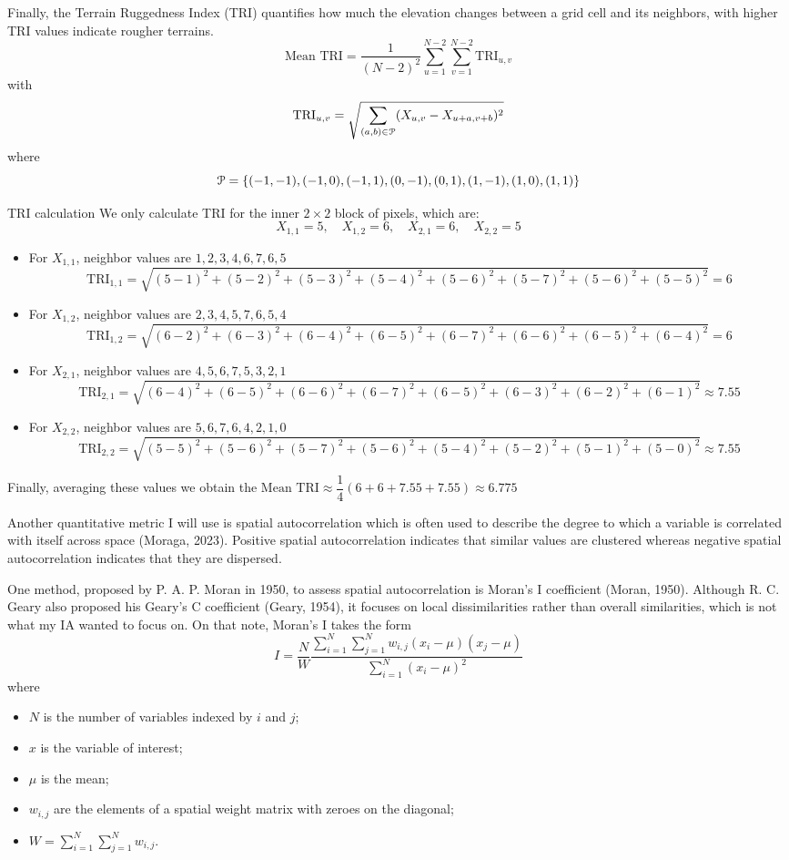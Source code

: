 Finally, the Terrain Ruggedness Index (TRI) quantifies how much the elevation changes between a grid cell and its neighbors, with higher TRI values indicate 
rougher terrains.
\[\text{Mean TRI}=\frac{1}{(N-2)^2}\sum_{u=1}^{N-2}\sum_{v=1}^{N-2}\text{TRI}_{u,v}\]
with 
\[\text{TRI}_{u,v}=\sqrt{\sum_{(a,b)\in \EuScript{P}}(X_{u,v}-{X_{u+a,v+b}})^2}\]
where
\[\EuScript{P}=\{(-1,-1),(-1,0),(-1,1),(0,-1),(0,1),(1,-1),(1,0),(1,1)\}\]
\begin{example}{TRI calculation}
    We only calculate TRI for the inner $2\times2$ block of pixels, which are:
    \[X_{1,1}=5,\quad X_{1,2}=6,\quad X_{2,1}=6,\quad X_{2,2}=5\]
    \begin{itemize}
        \item For $X_{1,1}$, neighbor values are $1,2,3,4,6,7,6,5$
        \[\text{TRI}_{1,1}=\sqrt{{(5-1)}^2+{(5-2)}^2+{(5-3)}^2+{(5-4)}^2+{(5-6)}^2+{(5-7)}^2+{(5-6)}^2+{(5-5)}^2}=6\]
        \item For $X_{1,2}$, neighbor values are $2,3,4,5,7,6,5,4$
        \[\text{TRI}_{1,2}=\sqrt{{(6-2)}^2+{(6-3)}^2+{(6-4)}^2+{(6-5)}^2+{(6-7)}^2+{(6-6)}^2+{(6-5)}^2+{(6-4)}^2}=6\]
        \item For $X_{2,1}$, neighbor values are $4,5,6,7,5,3,2,1$
        \[\text{TRI}_{2,1}=\sqrt{{(6-4)}^2+{(6-5)}^2+{(6-6)}^2+{(6-7)}^2+{(6-5)}^2+{(6-3)}^2+{(6-2)}^2+{(6-1)}^2}\approx7.55\]
        \item For $X_{2,2}$, neighbor values are $5,6,7,6,4,2,1,0$
        \[\text{TRI}_{2,2}=\sqrt{{(5-5)}^2+{(5-6)}^2+{(5-7)}^2+{(5-6)}^2+{(5-4)}^2+{(5-2)}^2+{(5-1)}^2+{(5-0)}^2}\approx7.55\]
    \end{itemize}
    Finally, averaging these values we obtain the $\text{Mean TRI}\approx\dfrac{1}{4}(6+6+7.55+7.55)\approx6.775$
\end{example}

Another quantitative metric I will use is spatial autocorrelation which is often used to describe the degree to which a variable is correlated with itself 
across space (Moraga, 2023). Positive spatial autocorrelation indicates that similar values are clustered whereas negative spatial autocorrelation indicates 
that they are dispersed. 

One method, proposed by P. A. P. Moran in 1950, to assess spatial autocorrelation is Moran's I coefficient (Moran, 1950). Although R. C. Geary also proposed 
his Geary's C coefficient (Geary, 1954), it focuses on local dissimilarities rather than overall similarities, which is not what my IA wanted to focus on. 
On that note, Moran's I takes the form
\[I=\frac{N}{W}\frac{\sum_{i=1}^{N}\sum_{j=1}^{N}w_{i,j}(x_i-\mu)(x_j-\mu)}{\sum_{i=1}^{N}{(x_i-\mu)}^2}\]
where
\begin{itemize}
    \item $N$ is the number of variables indexed by $i$ and $j$;
    \item $x$ is the variable of interest;
    \item $\mu$ is the mean;
    \item $w_{i,j}$ are the elements of a spatial weight matrix with zeroes on the diagonal;
    \item $W=\sum_{i=1}^{N}\sum_{j=1}^{N}w_{i,j}$.
\end{itemize}

